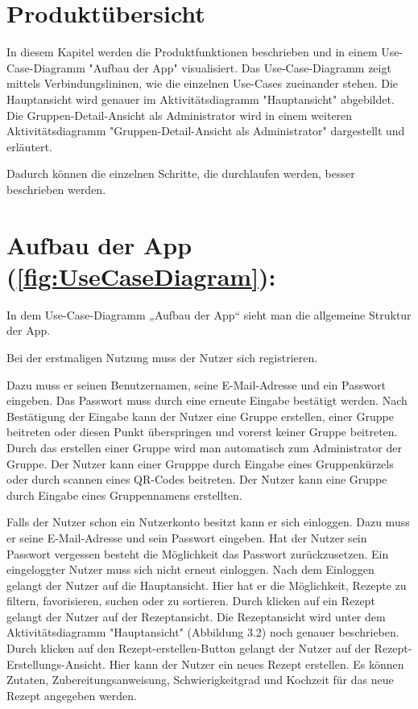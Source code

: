 \documentclass[parskip=full]{scrartcl}
\begin{document}
\newpage
\section{Produktübersicht}

In diesem Kapitel werden die Produktfunktionen beschrieben und in einem Use-Case-Diagramm "Aufbau der App" visualisiert.
Das Use-Case-Diagramm zeigt mittels Verbindungslininen, wie die einzelnen Use-Cases zueinander stehen.
Die Hauptansicht wird genauer im Aktivitätsdiagramm "Hauptansicht" abgebildet.
Die Gruppen-Detail-Ansicht als Administrator wird in einem weiteren Aktivitätsdiagramm "Gruppen-Detail-Ansicht als Administrator" dargestellt und erläutert.

Dadurch können die einzelnen Schritte, die durchlaufen werden, besser beschrieben werden.\par


\section{Aufbau der App (\autoref{fig:UseCaseDiagram}):}

In dem Use-Case-Diagramm „Aufbau der App“ sieht man die allgemeine Struktur der App.

Bei der erstmaligen Nutzung muss der Nutzer sich registrieren.

Dazu muss er seinen Benutzernamen, seine E-Mail-Adresse und ein Passwort eingeben.
Das Passwort muss durch eine erneute Eingabe bestätigt werden.
Nach Bestätigung der Eingabe kann der Nutzer eine Gruppe erstellen, einer Gruppe beitreten oder diesen Punkt überspringen und vorerst keiner Gruppe beitreten.
Durch das erstellen einer Gruppe wird man automatisch zum Administrator der Gruppe.
Der Nutzer kann einer Grupppe durch Eingabe eines Gruppenkürzels oder durch scannen eines QR-Codes beitreten.
Der Nutzer kann eine Gruppe durch Eingabe eines Gruppennamens erstellten.

Falls der Nutzer schon ein Nutzerkonto besitzt kann er sich einloggen.
Dazu muss er seine E-Mail-Adresse und sein Passwort eingeben.
Hat der Nutzer sein Passwort vergessen besteht die Möglichkeit das Passwort zurückzusetzen.
Ein eingeloggter Nutzer muss sich nicht erneut einloggen.\newline
Nach dem Einloggen gelangt der Nutzer auf die Hauptansicht.
Hier hat er die Möglichkeit, Rezepte zu filtern, favorisieren, suchen oder zu sortieren.
Durch klicken auf ein Rezept gelangt der Nutzer auf der Rezeptansicht.
Die Rezeptansicht wird unter dem Aktivitätsdiagramm "Hauptansicht" (Abbildung 3.2) noch genauer beschrieben.
Durch klicken auf den Rezept-erstellen-Button gelangt der Nutzer auf der Rezept-Erstellungs-Ansicht.
Hier kann der Nutzer ein neues Rezept erstellen.
Es können Zutaten, Zubereitungsanweisung, Schwierigkeitgrad und Kochzeit ƒür das neue Rezept angegeben werden.
\end{document}
